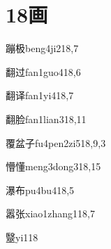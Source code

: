 
\section*{18画}

\begin{verbete}{蹦极}{beng4ji2}{18,7}
\end{verbete}

\begin{verbete}{翻过}{fan1guo4}{18,6}
\end{verbete}

\begin{verbete}{翻译}{fan1yi4}{18,7}
\end{verbete}

\begin{verbete}{翻脸}{fan1lian3}{18,11}
\end{verbete}

\begin{verbete}{覆盆子}{fu4pen2zi5}{18,9,3}
\end{verbete}

\begin{verbete}{懵懂}{meng3dong3}{18,15}
\end{verbete}

\begin{verbete}{瀑布}{pu4bu4}{18,5}
\end{verbete}

\begin{verbete}{嚣张}{xiao1zhang1}{18,7}
\end{verbete}

\begin{verbete}{毉}{yi1}{18}
\end{verbete}


